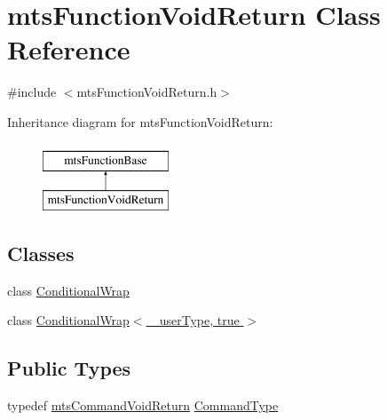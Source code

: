 \hypertarget{classmts_function_void_return}{\section{mts\-Function\-Void\-Return Class Reference}
\label{classmts_function_void_return}
}


{\ttfamily \#include $<$mts\-Function\-Void\-Return.\-h$>$}

Inheritance diagram for mts\-Function\-Void\-Return\-:\begin{figure}[H]
\begin{center}
\leavevmode
\includegraphics[height=2.000000cm]{db/dd6/classmts_function_void_return}
\end{center}
\end{figure}
\subsection*{Classes}
\begin{DoxyCompactItemize}
\item 
class \hyperlink{classmts_function_void_return_1_1_conditional_wrap}{Conditional\-Wrap}
\item 
class \hyperlink{classmts_function_void_return_1_1_conditional_wrap_3_01__user_type_00_01true_01_4}{Conditional\-Wrap$<$ \-\_\-user\-Type, true $>$}
\end{DoxyCompactItemize}
\subsection*{Public Types}
\begin{DoxyCompactItemize}
\item 
typedef \hyperlink{classmts_command_void_return}{mts\-Command\-Void\-Return} \hyperlink{classmts_function_void_return_a8aa3dea44f20057e4f47cbb20de87365}{Command\-Type}
\end{DoxyCompactItemize}
